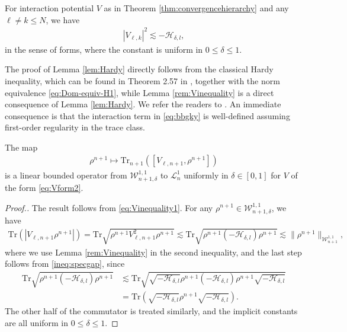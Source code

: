 \begin{lem}\label{rem:Vinequality}
For interaction potential $V$ as in Theorem
  \ref{thm:convergencehierarchy} and any $\ell \neq k \leqslant N$, we
  have
  \begin{align}\label{eq:Vinequality1}
    | V_{\ell, k} |^2 \lesssim - \mathcal{H}_{\delta, l},
  \end{align}
in the sense of forms, where the constant is uniform in $0 \leqslant \delta \leqslant 1$.
\end{lem}

The proof of Lemma \ref{lem:Hardy} directly follows from the classical Hardy inequality, which can be found in Theorem 2.57 in \cite{BCD11}, together with the norm equivalence \eqref{eq:Dom-equiv-H1}, while Lemma \ref{rem:Vinequality} is a direct consequence of Lemma \ref{lem:Hardy}. We refer the readers to \cite[Lemma 6.6 \& 6.7]{de2025stochastic}. An immediate consequence is that the interaction term in \eqref{eq:bbgky} is well-defined assuming first-order regularity in the trace class.
\begin{lem}
  \label{lem:IJ}The map 
\begin{align}
   \rho^{n + 1} \mapsto \mathrm{Tr}_{n + 1} ([V_{\ell, n + 1}, \rho^{n + 1}])
\end{align}
  is a linear bounded operator from $\mathcal{W}^{1, 1}_{n + 1, \delta}$ to
  $\mathcal{L}^1_n$ uniformly in $\delta \in [0, 1]$ for $V$ of the form
  \eqref{eq:Vform2}. 
\end{lem}

\begin{proof}[Proof.]
The result follows from \eqref{eq:Vinequality1}. For any $\rho^{n + 1}
\in \mathcal{W}^{1, 1}_{n + 1, \delta}$, we have
\begin{align*}
\mathrm{Tr} \left(\left| V_{\ell, n + 1} \rho^{n + 1}\right |\right) = \mathrm{Tr}
    \sqrt{\rho^{n + 1} V_{\ell, n + 1}^2 \rho^{n + 1}} \lesssim \mathrm{Tr}
    \sqrt{\rho^{n + 1} (- \mathcal{H}_{\delta, l})  \rho^{n + 1}} \lesssim \| \rho^{n + 1} \|_{\mathcal{W}_{n + 1}^{1, 1}},
\end{align*}
where we use Lemma \ref{rem:Vinequality} in the second inequality, and the last step follows from \eqref{ineq:specgap}, since
\begin{align*}
\mathrm{Tr}
    \sqrt{\rho^{n + 1} (- \mathcal{H}_{\delta, l})  \rho^{n + 1}} & \lesssim \mathrm{Tr}
    \sqrt{\sqrt{- \mathcal{H}_{\delta, l}}\rho^{n + 1} (- \mathcal{H}_{\delta, l})  \rho^{n + 1}\sqrt{- \mathcal{H}_{\delta, l}}} \\
    & =  \mathrm{Tr}\left(
    \sqrt{- \mathcal{H}_{\delta, l}}\rho^{n + 1} \sqrt{- \mathcal{H}_{\delta, l}} \right).
\end{align*}
The other half of the commutator is treated similarly, and the implicit constants are all uniform in $0
  \leqslant \delta \leqslant 1$.
\end{proof}

